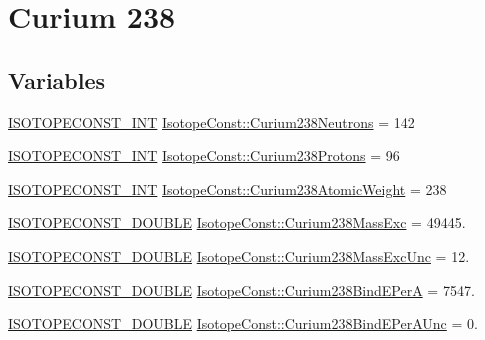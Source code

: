 \hypertarget{group___isotope_const-_curium-_cm238}{}\section{Curium 238}
\label{group___isotope_const-_curium-_cm238}
\subsection*{Variables}
\begin{DoxyCompactItemize}
\item 
\mbox{\hyperlink{group___isotope_const-_macros_ga5f18360b3e99483a35c32d789e62621c}{I\+S\+O\+T\+O\+P\+E\+C\+O\+N\+S\+T\+\_\+\+I\+NT}} \mbox{\hyperlink{group___isotope_const-_curium-_cm238_gacf94a83f1fa9b05a9700602b09dd2223}{Isotope\+Const\+::\+Curium238\+Neutrons}} = 142
\item 
\mbox{\hyperlink{group___isotope_const-_macros_ga5f18360b3e99483a35c32d789e62621c}{I\+S\+O\+T\+O\+P\+E\+C\+O\+N\+S\+T\+\_\+\+I\+NT}} \mbox{\hyperlink{group___isotope_const-_curium-_cm238_gaf24928bf94c58e8459c1196a63d05cc0}{Isotope\+Const\+::\+Curium238\+Protons}} = 96
\item 
\mbox{\hyperlink{group___isotope_const-_macros_ga5f18360b3e99483a35c32d789e62621c}{I\+S\+O\+T\+O\+P\+E\+C\+O\+N\+S\+T\+\_\+\+I\+NT}} \mbox{\hyperlink{group___isotope_const-_curium-_cm238_ga7bc21a74aafd18081f735e4558dd442d}{Isotope\+Const\+::\+Curium238\+Atomic\+Weight}} = 238
\item 
\mbox{\hyperlink{group___isotope_const-_macros_ga8f45a7272ce02c0b4c65c44636ed719a}{I\+S\+O\+T\+O\+P\+E\+C\+O\+N\+S\+T\+\_\+\+D\+O\+U\+B\+LE}} \mbox{\hyperlink{group___isotope_const-_curium-_cm238_ga617116961b7507a018e08f7fa5ddaca4}{Isotope\+Const\+::\+Curium238\+Mass\+Exc}} = 49445.
\item 
\mbox{\hyperlink{group___isotope_const-_macros_ga8f45a7272ce02c0b4c65c44636ed719a}{I\+S\+O\+T\+O\+P\+E\+C\+O\+N\+S\+T\+\_\+\+D\+O\+U\+B\+LE}} \mbox{\hyperlink{group___isotope_const-_curium-_cm238_ga7ca196d65b3bd64586e8055f97a4e2fa}{Isotope\+Const\+::\+Curium238\+Mass\+Exc\+Unc}} = 12.
\item 
\mbox{\hyperlink{group___isotope_const-_macros_ga8f45a7272ce02c0b4c65c44636ed719a}{I\+S\+O\+T\+O\+P\+E\+C\+O\+N\+S\+T\+\_\+\+D\+O\+U\+B\+LE}} \mbox{\hyperlink{group___isotope_const-_curium-_cm238_gab7530f9c2355220735dacc352495a810}{Isotope\+Const\+::\+Curium238\+Bind\+E\+PerA}} = 7547.
\item 
\mbox{\hyperlink{group___isotope_const-_macros_ga8f45a7272ce02c0b4c65c44636ed719a}{I\+S\+O\+T\+O\+P\+E\+C\+O\+N\+S\+T\+\_\+\+D\+O\+U\+B\+LE}} \mbox{\hyperlink{group___isotope_const-_curium-_cm238_gadf01f5672af69ce83f681e7179e5a332}{Isotope\+Const\+::\+Curium238\+Bind\+E\+Per\+A\+Unc}} = 0.

\end{DoxyCompactItemize}
